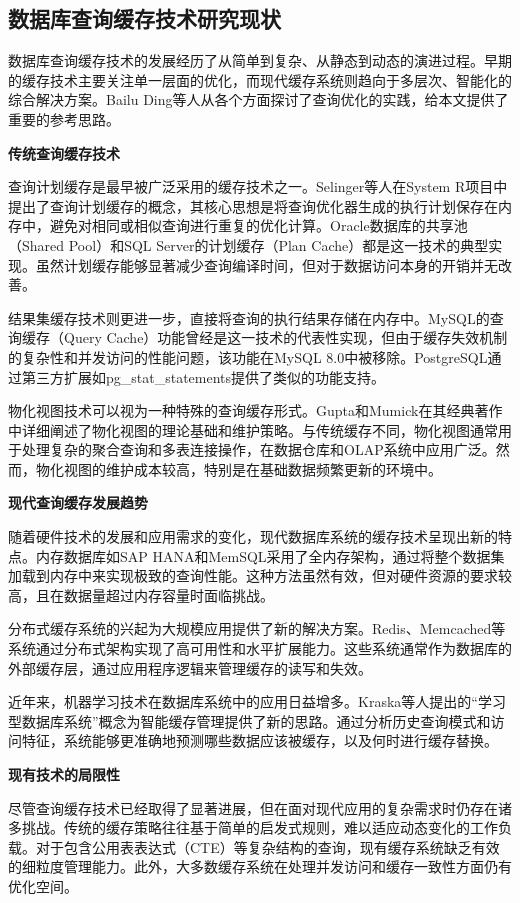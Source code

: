 \subsection{数据库查询缓存技术研究现状}

数据库查询缓存技术的发展经历了从简单到复杂、从静态到动态的演进过程。早期的缓存技术主要关注单一层面的优化，而现代缓存系统则趋向于多层次、智能化的综合解决方案。Bailu Ding\cite{c78}等人从各个方面探讨了查询优化的实践，给本文提供了重要的参考思路。

\textbf{传统查询缓存技术}

查询计划缓存是最早被广泛采用的缓存技术之一。Selinger等人在System R项目中提出了查询计划缓存的概念\cite{c1}，其核心思想是将查询优化器生成的执行计划保存在内存中，避免对相同或相似查询进行重复的优化计算。Oracle数据库的共享池（Shared Pool）和SQL Server的计划缓存（Plan Cache）都是这一技术的典型实现\cite{c4}。虽然计划缓存能够显著减少查询编译时间，但对于数据访问本身的开销并无改善。

结果集缓存技术则更进一步，直接将查询的执行结果存储在内存中。MySQL的查询缓存（Query Cache）功能曾经是这一技术的代表性实现，但由于缓存失效机制的复杂性和并发访问的性能问题，该功能在MySQL 8.0中被移除。PostgreSQL通过第三方扩展如pg\_stat\_statements提供了类似的功能支持。

物化视图技术可以视为一种特殊的查询缓存形式。Gupta和Mumick在其经典著作中详细阐述了物化视图的理论基础和维护策略\cite{c5}。与传统缓存不同，物化视图通常用于处理复杂的聚合查询和多表连接操作，在数据仓库和OLAP系统中应用广泛。然而，物化视图的维护成本较高，特别是在基础数据频繁更新的环境中。

\textbf{现代查询缓存发展趋势}

随着硬件技术的发展和应用需求的变化，现代数据库系统的缓存技术呈现出新的特点。内存数据库如SAP HANA和MemSQL采用了全内存架构\cite{c6}，通过将整个数据集加载到内存中来实现极致的查询性能。这种方法虽然有效，但对硬件资源的要求较高，且在数据量超过内存容量时面临挑战。

分布式缓存系统的兴起为大规模应用提供了新的解决方案。Redis、Memcached等系统通过分布式架构实现了高可用性和水平扩展能力\cite{c7}。这些系统通常作为数据库的外部缓存层，通过应用程序逻辑来管理缓存的读写和失效。

近年来，机器学习技术在数据库系统中的应用日益增多。Kraska等人提出的“学习型数据库系统”概念\cite{c8}为智能缓存管理提供了新的思路。通过分析历史查询模式和访问特征，系统能够更准确地预测哪些数据应该被缓存，以及何时进行缓存替换。

\textbf{现有技术的局限性}

尽管查询缓存技术已经取得了显著进展，但在面对现代应用的复杂需求时仍存在诸多挑战。传统的缓存策略往往基于简单的启发式规则，难以适应动态变化的工作负载。对于包含公用表表达式（CTE）等复杂结构的查询，现有缓存系统缺乏有效的细粒度管理能力。此外，大多数缓存系统在处理并发访问和缓存一致性方面仍有优化空间。

